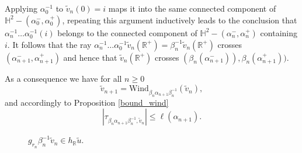 \documentclass[a4paper,english,reqno]{amsart}
\newcommand{\R}{\mathbb{R}}
\renewcommand{\H}{\mathbb{H}}
\newcommand{\N}{\mathbb{N}} %
\newtheorem{property}{Property} %
\theoremstyle{definition}
\numberwithin{equation}{section}
\begin{document}


Applying $\alpha_0^{-1}$ to $\tilde v_n(0)=i$ maps it into the same connected component of $\H^2-(\alpha_0^-,\alpha_0^+)$, repeating this argument inductively leads to the conclusion that $\alpha_{n}^{-1}\ldots\alpha_0^{-1}(i)$ belongs to the connected component of $\H^2-(\alpha_n^-,\alpha_n^+)$ containing $i$. It follows that
 the ray $\alpha_{n}^{-1}\ldots\alpha_0^{-1}\tilde v_n(\R ^+)=\beta_n^{-1}\tilde v_n(\R ^+)$ crosses $(\alpha_{n+1}^-,\alpha_{n+1}^+) $ and hence that $\tilde v_n(\R^+)$ crosses $(\beta_n(\alpha_{n+1}^-)),\beta_n(\alpha_{n+1}^+) )$.

As a consequence we have for all $n\geq 0$
$$
\tilde v_{n+1}=\mathrm{Wind}_{\beta_n\alpha_{n+1}\beta_n^{-1}}(\tilde v_n),
$$
and accordingly to Proposition \ref{bound_wind}
$$
\left|\tau_{\beta_n\alpha_{n+1}\beta_n^{-1},\tilde v_n}\right |\leq \ell(\alpha_{n+1}).
$$

	\begin{figure}[htbp]
	\centering
	\begin{normalsize} 
		\def\svgwidth{13cm}
		dessin13.pdf_tex}
	\end{normalsize}
	\caption{$g_{r_n}\beta_n^{-1}\tilde v_n\in h_\R\tilde u$.}
	\label{dessin13}
\end{figure}
\end{document}
